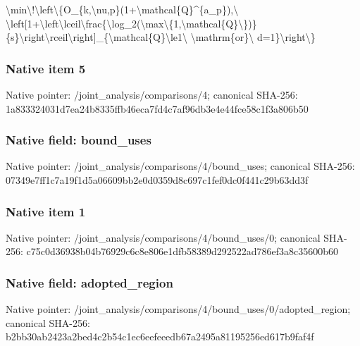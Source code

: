 \documentclass[10pt,a4paper]{article}
\begin{document}
\begingroup\raggedright\sloppy \textbackslash{}min\textbackslash{}!\textbackslash{}left\textbackslash{}\{O\_\allowbreak{}\{k,\allowbreak{}\textbackslash{}nu,\allowbreak{}p\}(1+\textbackslash{}mathcal\{Q\}\textasciicircum{}\{a\_\allowbreak{}p\}),\allowbreak{}\textbackslash{} \textbackslash{}left[1+\textbackslash{}left\textbackslash{}lceil\textbackslash{}frac\{\textbackslash{}log\_\allowbreak{}2(\textbackslash{}max\textbackslash{}\{1,\allowbreak{}\textbackslash{}mathcal\{Q\}\textbackslash{}\})\}\{s\}\textbackslash{}right\textbackslash{}rceil\textbackslash{}right]\_\allowbreak{}\{\textbackslash{}mathcal\{Q\}\textbackslash{}le1\textbackslash{} \textbackslash{}mathrm\{or\}\textbackslash{} d=\allowbreak{}1\}\textbackslash{}right\textbackslash{}\}\par\endgroup

\subsubsection{Native item 5}
Native pointer: /joint\_\allowbreak{}analysis/comparisons/4; canonical SHA-256: 1a833324031d7ea24b8335ffb46eca7fd4c7af96db3e4e44fce58c1f3a806b50

\subsubsection{Native field: bound\_\allowbreak{}uses}
Native pointer: /joint\_\allowbreak{}analysis/comparisons/4/bound\_\allowbreak{}uses; canonical SHA-256: 07349e7ff1c7a19f1d5a06609bb2e0d0359d8c697c1fef0dc0f441c29b63dd3f

\subsubsection{Native item 1}
Native pointer: /joint\_\allowbreak{}analysis/comparisons/4/bound\_\allowbreak{}uses/0; canonical SHA-256: c75c0d36938b04b76929c6c8e806e1dfb58389d292522ad786ef3a8c35600b60

\subsubsection{Native field: adopted\_\allowbreak{}region}
Native pointer: /joint\_\allowbreak{}analysis/comparisons/4/bound\_\allowbreak{}uses/0/adopted\_\allowbreak{}region; canonical SHA-256: b2bb30ab2423a2bed4c2b54c1ec6eefeeedb67a2495a81195256ed617b9faf4f
\end{document}
